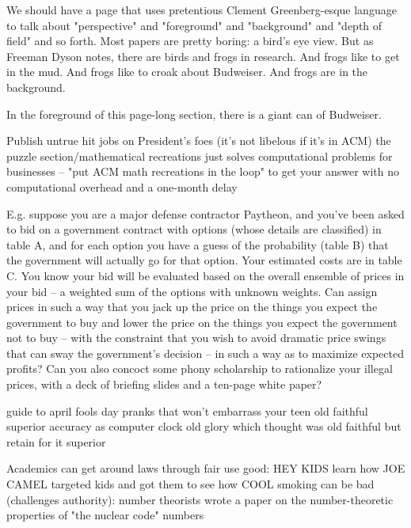 We should have a page that uses pretentious Clement Greenberg-esque language to talk about "perspective" and "foreground" and "background" and "depth of field" and so forth. Most papers are pretty boring: a bird's eye view. But as Freeman Dyson notes, there are birds and frogs in research. And frogs like to get in the mud. And frogs like to croak about Budweiser. And frogs are in the background.

In the foreground of this page-long section, there is a giant can of Budweiser.

Publish untrue hit jobs on President's foes (it's not libelous if it's in ACM)
the puzzle section/mathematical recreations just solves computational problems for businesses -- "put ACM math recreations in the loop" to get your answer with no computational overhead and a one-month delay

E.g. suppose you are a major defense contractor Paytheon, and you've been asked to bid on a government contract with options (whose details are classified) in table A, and for each option you have a guess of the probability (table B) that the government will actually go for that option. Your estimated costs are in table C. You know your bid will be evaluated based on the overall ensemble of prices in your bid -- a weighted sum of the options with unknown weights. Can assign prices in such a way that you jack up the price on the things you expect the government to buy and lower the price on the things you expect the government not to buy -- with the constraint that you wish to avoid dramatic price swings that can sway the government's decision -- in such a way as to maximize expected profits? Can you also concoct some phony scholarship to rationalize your illegal prices, with a deck of briefing slides and a ten-page white paper?

guide to april fools day pranks that won't embarrass your teen
old faithful superior accuracy as computer clock
old glory which thought was old faithful but retain for it superior

Academics can get around laws through fair use
good: HEY KIDS learn how JOE CAMEL targeted kids and got them to see how COOL smoking can be
bad (challenges authority): number theorists wrote a paper on the number-theoretic properties of "the nuclear code" numbers